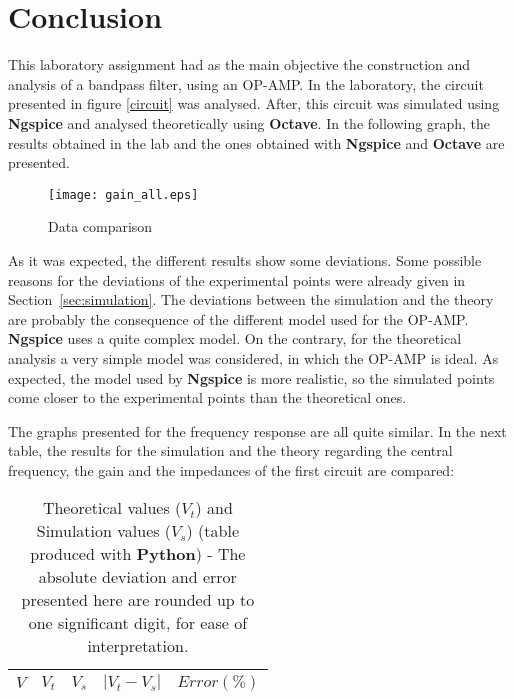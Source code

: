 \newpage

\section{Conclusion}
\label{sec:conclusion}

This laboratory assignment had as the main objective the construction and analysis of a bandpass filter, using an OP-AMP. In the laboratory, the circuit presented in figure \ref{circuit} was analysed. After, this circuit was simulated using {\bf Ngspice} and analysed theoretically using {\bf Octave}. In the following graph, the results obtained in the lab and the ones obtained with {\bf Ngspice} and {\bf Octave} are presented.

\begin{figure}[H]
        \centering
        \texttt{[image: gain\_all.eps]}
        \caption{Data comparison}
        \label{alldata}
\end{figure}

As it was expected, the different results show some deviations. Some possible reasons for the deviations of the experimental points were already given in Section~\ref{sec:simulation}. The deviations between the simulation and the theory are probably the consequence of the different model used for the OP-AMP. {\bf Ngspice} uses a quite complex model. On the contrary, for the theoretical analysis a very simple model was considered, in which the OP-AMP is ideal. As expected, the model used by {\bf Ngspice} is more realistic, so the simulated points come closer to the experimental points than the theoretical ones.

\newpage

The graphs presented for the frequency response are all quite similar. In the next table, the results for the simulation and the theory regarding the central frequency, the gain and the impedances of the first circuit are compared:

\begin{table}[H]
  \centering
  \begin{tabular}{|c|c|c|c|c|}
    \hline
        $V$ & $V_t$ & $V_s$ & $|V_t-V_s|$ & $Error (\%)$ \\
        \hline
        \hline
        
        \hline
  \end{tabular}
  \caption{Theoretical values ($V_t$) and Simulation values ($V_s$) (table produced with {\bf Python})  - The absolute deviation and error presented here are rounded up to one significant digit, for ease of interpretation.}
  \label{error1_res}
\end{table}

